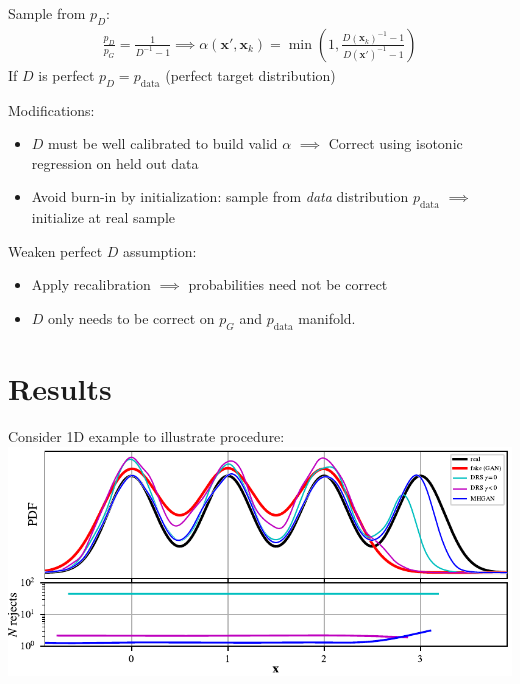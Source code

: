 \documentclass[a0,landscape]{a0poster}
\newcommand{\mysection}[1]{\section*{\fontsize{67.1}{82} \selectfont \color{NavyBlue} #1 \color{Black}}}
\renewcommand{\vec}[1]{{\boldsymbol{\mathbf{#1}}}} %
\newcommand{\PG}{{p_G}}
\newcommand{\PD}{{p_D}}
\newcommand{\PR}{{p_{\textrm{data}}}}
\newcommand{\accept}{\alpha}
\begin{document}
\begin{multicols}{3}
Sample from $\PD$:
\begin{align}
  \frac{\PD}{\PG} = \frac{1}{D^{-1} - 1} \implies
  \accept(\vec x', \vec x_k) = \min\left(1, \frac{D(\vec x_k)^{-1} - 1}{D(\vec x')^{-1} - 1}\right)
\end{align}
If $D$ is perfect $\PD = \PR$ (perfect target distribution)

Modifications:
\begin{itemize}
  \item $D$ must be well calibrated to build valid $\accept$ $\implies$ Correct using isotonic regression on held out data
  \item Avoid burn-in by initialization: sample from \emph{data} distribution $\PR$ $\implies$ initialize at real sample
\end{itemize}

Weaken perfect $D$ assumption:
\begin{itemize}
  \item Apply recalibration $\implies$ probabilities need not be correct
  \item $D$ only needs to be correct on $\PG$ and $\PR$ manifold.
\end{itemize}

\columnbreak

\mysection{Results}

Consider 1D example to illustrate procedure:\\
\includegraphics[scale=2.5]{../figures/univariate_example.pdf}


\end{multicols}
\end{document}
